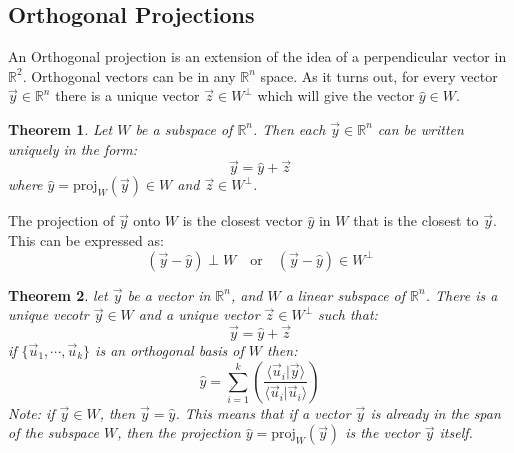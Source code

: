 \documentclass[11pt, a4paper]{article}
\newcommand*{\R}{\ensuremath{\mathbb{R}}}
\newtheorem{theorem}{Theorem}
\begin{document}
\subsection{Orthogonal Projections}
An Orthogonal projection is an extension of the idea of a perpendicular vector in $\R^2$. Orthogonal vectors can be in any $\R^n$ space. As it turns out, for every vector $\vec{y} \in \R^n$ there is a unique vector $\vec{z} \in W^\perp$ which will give the vector $\hat{y} \in W$.
\begin{theorem}
  Let $W$ be a subspace of $\R^n$. Then each $\vec{y} \in \R^n$ can be written uniquely in the form:
  \begin{equation}
    \vec{y} = \hat{y} + \vec{z}
  \end{equation}
  where $\hat{y} = \text{proj}_W(\vec{y}) \in W$ and $\vec{z} \in W^\perp$.
\end{theorem}
The projection of $\vec{y}$ onto $W$ is the closest vector $\hat{y}$ in $W$ that is the closest to $\vec{y}$. This can be expressed as:
\begin{equation}
  (\vec{y} - \hat{y})\perp W \quad \text{or} \quad (\vec{y} - \hat{y}) \in W^\perp
\end{equation}
\begin{theorem}
  let $\vec{y}$ be a vector in $\R^n$, and $W$ a linear subspace of $\R^n$. There is a unique vecotr $\vec{y} \in W$ and a unique vector $\vec{z} \in W^\perp$ such that:
  \begin{equation}
    \vec{y} = \hat{y} + \vec{z}
  \end{equation}
  if $\{ \vec{u}_1, \cdots, \vec{u}_k\}$ is an orthogonal basis of $W$ then:
  \begin{equation}
    \hat{y} = \sum_{i=1}^k\left(\frac{\langle \vec{u}_i | \vec{y} \rangle}{\langle \vec{u}_i | \vec{u}_i \rangle}\right)
  \end{equation}
  Note: if $\vec{y} \in W$, then $\vec{y} = \hat{y}$. This means that if a vector $\vec{y}$ is already in the span of the subspace $W$, then the projection $\hat{y} = \text{proj}_W(\vec{y})$ is the vector $\vec{y}$ itself.
\end{theorem}
\end{document}
